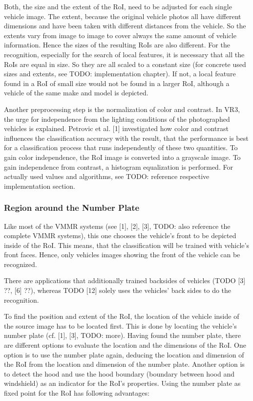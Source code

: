 Both, the size and the extent of the RoI, need to be adjusted for each single vehicle image. The extent, because the original vehicle photos all have different dimensions and have been taken with different distances from the vehicle. So the extents vary from image to image to cover always the same amount of vehicle information. Hence the sizes of the resulting RoIs are also different. For the recognition, especially for the search of local features, it is necessary that all the RoIs are equal in size. So they are all scaled to a constant size (for concrete used sizes and extents, see TODO: implementation chapter). If not, a local feature found in a RoI of small size would not be found in a larger RoI, although a vehicle of the same make and model is depicted.

Another preprocessing step is the normalization of color and contrast. In VR3, the urge for independence from the lighting conditions of the photographed vehicles is explained. Petrovic et al. [1] investigated how color and contrast influences the classification accuracy with the result, that the performance is best for a classification process that runs independently of these two quantities. To gain color independence, the RoI image is converted into a grayscale image. To gain independence from contrast, a histogram equalization is performed. For actually used values and algorithms, see TODO: reference respective implementation section.

\subsubsection{Region around the Number Plate}\label{sec:regionAroundNumberPlate}
Like most of the VMMR systems (see [1], [2], [3], TODO: also reference the complete VMMR systems), this one chooses the vehicle’s front to be depicted inside of the RoI. This means, that the classification will be trained with vehicle’s front faces. Hence, only vehicles images showing the front of the vehicle can be recognized.

There are applications that additionally trained backsides of vehicles (TODO [3] ??, [6] ??), whereas TODO [12] solely uses the vehicles' back sides to do the recognition.

To find the position and extent of the RoI, the location of the vehicle inside of the source image has to be located first. This is done by locating the vehicle's number plate (cf. [1], [3], TODO: more). Having found the number plate, there are different options to evaluate the location and the dimensions of the RoI. One option is to use the number plate again, deducing the location and dimension of the RoI from the location and dimension of the number plate. Another option is to detect the hood and use the hood boundary (boundary between hood and windshield) as an indicator for the RoI’s properties. Using the number plate as fixed point for the RoI has following advantages:


